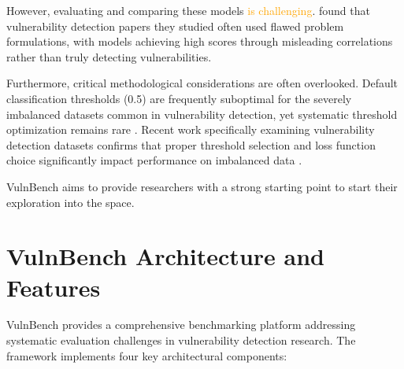 \documentclass[letterpaper]{article}
\newcommand{\change}[2][]{\textcolor{orange}{#2}}
\begin{document}
However, evaluating and comparing these models \change[faces significant methodological challenges]{is challenging}. \cite{risse2025top} found that vulnerability detection papers they studied often used flawed problem formulations, with models achieving high scores through misleading correlations rather than truly detecting vulnerabilities.

Furthermore, critical methodological considerations are often overlooked. Default classification thresholds (0.5) are frequently suboptimal for the severely imbalanced datasets common in vulnerability detection, yet systematic threshold optimization remains rare \citep{ghost2021, leevy2023optimal}. Recent work specifically examining vulnerability detection datasets confirms that proper threshold selection and loss function choice significantly impact performance on imbalanced data \citep{he2025imbalance}.

VulnBench aims to provide researchers with a strong starting point to start their exploration into the space.

\section{VulnBench Architecture and Features}

VulnBench provides a comprehensive benchmarking platform addressing systematic evaluation challenges in vulnerability detection research. The framework implements four key architectural components:
\end{document}
